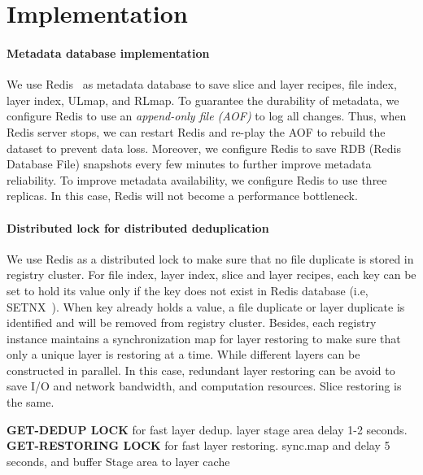 \section{Implementation}
\label{sec:impl}

\paragraph{Metadata database implementation}
We use Redis~\cite{xxx} as metadata database to save slice and layer recipes, file index, layer index, ULmap, and RLmap.
To guarantee the durability of metadata, 
we configure Redis to use an \emph{append-only file (AOF)} to log all changes.
Thus, when Redis server stops, we can restart Redis and re-play the AOF to rebuild the dataset to prevent data loss.
Moreover, we configure Redis to save RDB (Redis Database File) snapshots every few minutes to further improve metadata reliability. 
To improve metadata availability, 
we configure Redis to use three replicas.
In this case, Redis will not become a performance bottleneck.

\paragraph{Distributed lock for distributed deduplication}
We use Redis as a distributed lock to make sure that no file duplicate is stored in registry cluster.
For file index, layer index, slice and layer recipes, each key can be set to hold its value only if the key does not exist in Redis database (i.e, SETNX~\cite{xxx}).
When key already holds a value, a file duplicate or layer duplicate is identified and will be removed from registry cluster.
 Besides, 
 each registry instance maintains a  synchronization map for layer restoring to make sure that only a unique layer is restoring at a time.
 While different layers can be constructed in parallel. 
 In this case, redundant layer restoring can be avoid to save I/O and network bandwidth, and computation resources.
 Slice restoring is the same.
 
 \textbf{GET-DEDUP LOCK} for fast layer dedup.
 layer stage area delay 1-2 seconds.
 \textbf{GET-RESTORING LOCK} for fast layer restoring.
 sync.map and delay 5 seconds, and buffer
 Stage area to layer cache

